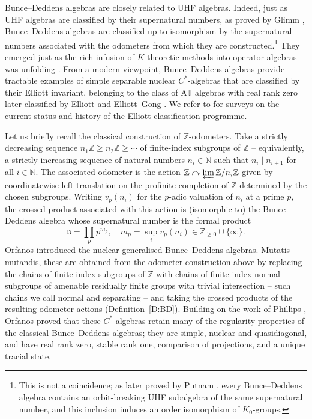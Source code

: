 \documentclass[11pt,a4,leqno]{amsart}
\theoremstyle{definition}
\theoremstyle{remark}
\numberwithin{equation}{section}
\theoremstyle{plain}
\newcommand{\Nb}{\mathbb{N}}
\newcommand{\Zb}{\mathbb{Z}}
\newcommand{\Tb}{\mathbb{T}}
\begin{document}
Bunce--Deddens algebras are closely related to UHF algebras. Indeed, just as UHF algebras are classified by their supernatural numbers, as proved by Glimm \cite{Gli60}, Bunce--Deddens algebras are classified up to isomorphism by the supernatural numbers associated with the odometers from which they are constructed.\footnote{This is not a coincidence; as later proved by Putnam \cite{Put89}, every Bunce--Deddens algebra contains an orbit-breaking UHF subalgebra of the same supernatural number, and this inclusion induces an order isomorphism of $K_0$-groups.} They emerged just as the rich infusion of $K$-theoretic methods into operator algebras was unfolding \cite{Ell76,PimVoi80,Rie81}. From a modern viewpoint, Bunce--Deddens algebras provide tractable examples of simple separable nuclear $C^*$-algebras that are classified by their Elliott invariant, belonging to the class of A$\Tb$ algebras with real rank zero later classified by Elliott and Elliott--Gong \cite{Ell93,EllGon96}. We refer to \cite{Win19,Whi22} for surveys on the current status and history of the Elliott classification programme.

Let us briefly recall the classical construction of $\Zb$-odometers. Take a strictly decreasing sequence $n_1\Zb\ge n_2\Zb \ge \cdots$ of finite-index subgroups of $\Zb$ -- equivalently, a strictly increasing sequence of natural numbers $n_i \in \Nb$ such that $n_i \mid n_{i+1}$ for all $i \in \Nb$. The associated odometer is the action $\Zb \curvearrowright \varprojlim \Zb/n_i\Zb$ given by coordinatewise left-translation on the profinite completion of $\Zb$ determined by the chosen subgroups. Writing $v_p(n_i)$ for the $p$-adic valuation of $n_i$ at a prime $p$, the crossed product associated with this action is (isomorphic to) the Bunce--Deddens algebra whose supernatural number is the formal product 
\[
    \mathfrak{n} = \prod_{p} p^{m_p}, \quad  m_p=\sup_i v_p(n_i)\in \Zb_{\ge 0}\cup\{\infty\}. 
\]
Orfanos \cite{Orf10} introduced the nuclear generalised Bunce--Deddens algebras. Mutatis mutandis, these are obtained from the odometer construction above by replacing the chains of finite-index  subgroups of $\Zb$ with chains of finite-index normal subgroups of amenable residually finite groups with trivial intersection -- such chains we call normal and separating -- and taking the crossed products of the resulting odometer actions (Definition~\ref{D:BD}). Building on the work of Phillips \cite{Phi05}, Orfanos proved that these $C^*$-algebras retain many of the regularity properties of the classical Bunce--Deddens algebras; they are simple, nuclear and quasidiagonal, and have real rank zero, stable rank one, comparison of projections, and a unique tracial state.
\end{document}
